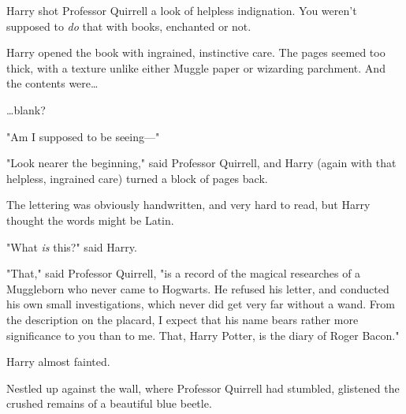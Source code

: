 Harry shot Professor Quirrell a look of helpless indignation. You weren't
supposed to \emph{do} that with books, enchanted or not.

Harry opened the book with ingrained, instinctive care. The pages seemed too
thick, with a texture unlike either Muggle paper or wizarding parchment. And
the contents were{\ldots}

{\ldots}blank?

"Am I supposed to be seeing---"

"Look nearer the beginning," said Professor Quirrell, and Harry (again with
that helpless, ingrained care) turned a block of pages back.

The lettering was obviously handwritten, and very hard to read, but Harry
thought the words might be Latin.

"What \emph{is} this?" said Harry.

"That," said Professor Quirrell, "is a record of the magical researches of a
Muggleborn who never came to Hogwarts. He refused his letter, and conducted his
own small investigations, which never did get very far without a wand. From the
description on the placard, I expect that his name bears rather more
significance to you than to me. That, Harry Potter, is the diary of Roger
Bacon."

Harry almost fainted.

Nestled up against the wall, where Professor Quirrell had stumbled, glistened
the crushed remains of a beautiful blue beetle.

